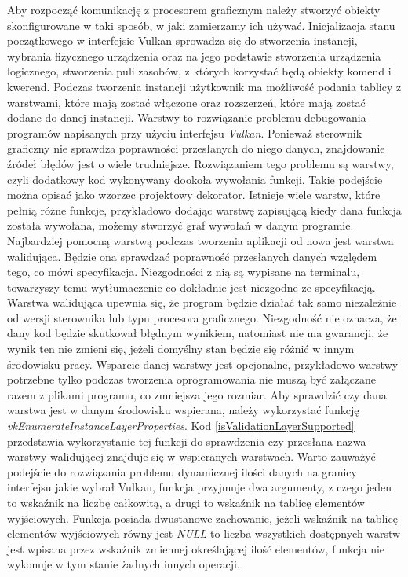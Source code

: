 Aby rozpocząć komunikację z procesorem graficznym należy stworzyć obiekty skonfigurowane w taki sposób, w jaki zamierzamy ich używać. 
Inicjalizacja stanu początkowego w interfejsie Vulkan sprowadza się do stworzenia instancji, wybrania fizycznego urządzenia oraz na jego podstawie stworzenia urządzenia logicznego, stworzenia puli zasobów, z których korzystać będą obiekty komend i kwerend.
Podczas tworzenia instancji użytkownik ma możliwość podania tablicy z warstwami, które mają zostać włączone oraz rozszerzeń, które mają zostać dodane do danej instancji. 
Warstwy to rozwiązanie problemu debugowania programów napisanych przy użyciu interfejsu \textit{Vulkan}.
Ponieważ sterownik graficzny nie sprawdza poprawności przesłanych do niego danych, znajdowanie źródeł błędów jest o wiele trudniejsze.
Rozwiązaniem tego problemu są warstwy, czyli dodatkowy kod wykonywany dookoła wywołania funkcji. 
Takie podejście można opisać jako wzorzec projektowy dekorator.
Istnieje wiele warstw, które pełnią różne funkcje, przykładowo dodając warstwę zapisującą kiedy dana funkcja została wywołana, możemy stworzyć graf wywołań w danym programie.
Najbardziej pomocną warstwą podczas tworzenia aplikacji od nowa jest warstwa walidująca.
Będzie ona sprawdzać poprawność przesłanych danych względem tego, co mówi specyfikacja.
Niezgodności z nią są wypisane na terminalu, towarzyszy temu wytłumaczenie co dokładnie jest niezgodne ze specyfikacją.
Warstwa walidująca upewnia się, że program będzie działać tak samo niezależnie od wersji sterownika lub typu procesora graficznego.
Niezgodność nie oznacza, że dany kod będzie skutkował błędnym wynikiem, natomiast nie ma gwarancji, że wynik ten nie zmieni się, jeżeli domyślny stan będzie się różnić w innym środowisku pracy.
Wsparcie danej warstwy jest opcjonalne, przykładowo warstwy potrzebne tylko podczas tworzenia oprogramowania nie muszą być załączane razem z plikami programu, co zmniejsza jego rozmiar.
Aby sprawdzić czy dana warstwa jest w danym środowisku wspierana, należy wykorzystać funkcję \textit{vkEnumerateInstanceLayerProperties}.
Kod \ref{isValidationLayerSupported} przedstawia wykorzystanie tej funkcji do sprawdzenia czy przesłana nazwa warstwy walidującej znajduje się w wspieranych warstwach.
Warto zauważyć podejście do rozwiązania problemu dynamicznej ilości danych na granicy interfejsu jakie wybrał Vulkan, funkcja przyjmuje dwa argumenty, z czego jeden to wskaźnik na liczbę całkowitą, a drugi to wskaźnik na tablicę elementów wyjściowych.
Funkcja posiada dwustanowe zachowanie, jeżeli wskaźnik na tablicę elementów wyjściowych równy jest \textit{NULL} to liczba wszystkich dostępnych warstw jest wpisana przez wskaźnik zmiennej określającej ilość elementów, funkcja nie wykonuje w tym stanie żadnych innych operacji.
